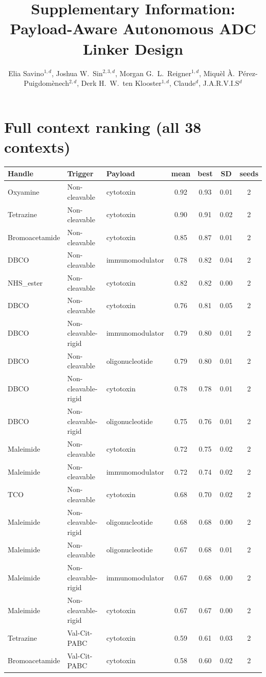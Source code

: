 \documentclass[10pt]{article}
\title{\textbf{Supplementary Information: Payload-Aware Autonomous ADC Linker Design}}
\author{Elia Savino$^{1,d}$, Joshua W.\ Sin$^{2,3,d}$, Morgan G.\ L.\ Reigner$^{1,d}$, Miqu\`el \`A.\ P\'erez-Puigdom\`enech$^{2,d}$, Derk H.\ W.\ ten Klooster$^{1,d}$, Claude$^{d}$, J.A.R.V.I.S$^{d}$}
\date{}
\begin{document}
\maketitle
\section{Full context ranking (all 38 contexts)}
\begin{longtable}{l l l c c c c}\toprule
Handle & Trigger & Payload & mean & best & SD & seeds \\ \midrule\endhead
Oxyamine & Non-cleavable & cytotoxin & 0.92 & 0.93 & 0.01 & 2 \\
Tetrazine & Non-cleavable & cytotoxin & 0.90 & 0.91 & 0.02 & 2 \\
Bromoacetamide & Non-cleavable & cytotoxin & 0.85 & 0.87 & 0.01 & 2 \\
DBCO & Non-cleavable & immunomodulator & 0.78 & 0.82 & 0.04 & 2 \\
NHS\_ester & Non-cleavable & cytotoxin & 0.82 & 0.82 & 0.00 & 2 \\
DBCO & Non-cleavable & cytotoxin & 0.76 & 0.81 & 0.05 & 2 \\
DBCO & Non-cleavable-rigid & immunomodulator & 0.79 & 0.80 & 0.01 & 2 \\
DBCO & Non-cleavable & oligonucleotide & 0.79 & 0.80 & 0.01 & 2 \\
DBCO & Non-cleavable-rigid & cytotoxin & 0.78 & 0.78 & 0.01 & 2 \\
DBCO & Non-cleavable-rigid & oligonucleotide & 0.75 & 0.76 & 0.01 & 2 \\
Maleimide & Non-cleavable & cytotoxin & 0.72 & 0.75 & 0.02 & 2 \\
Maleimide & Non-cleavable & immunomodulator & 0.72 & 0.74 & 0.02 & 2 \\
TCO & Non-cleavable & cytotoxin & 0.68 & 0.70 & 0.02 & 2 \\
Maleimide & Non-cleavable-rigid & oligonucleotide & 0.68 & 0.68 & 0.00 & 2 \\
Maleimide & Non-cleavable & oligonucleotide & 0.67 & 0.68 & 0.01 & 2 \\
Maleimide & Non-cleavable-rigid & immunomodulator & 0.67 & 0.68 & 0.00 & 2 \\
Maleimide & Non-cleavable-rigid & cytotoxin & 0.67 & 0.67 & 0.00 & 2 \\
Tetrazine & Val-Cit-PABC & cytotoxin & 0.59 & 0.61 & 0.03 & 2 \\
Bromoacetamide & Val-Cit-PABC & cytotoxin & 0.58 & 0.60 & 0.02 & 2 \\

\end{longtable}
\end{document}

